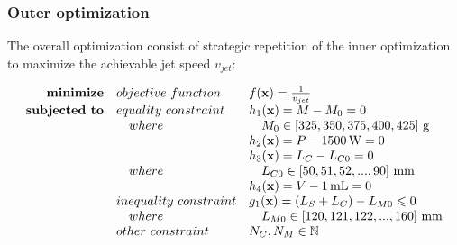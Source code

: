         \subsubsection{Outer optimization}      \label{Chapter:PMLSM design HM/design optimization/optimization formulation/out}
        
        
            The overall optimization consist of strategic repetition of the inner optimization to maximize the achievable jet speed $v_{jet}$:
        
        
            \begin{equation}
                \begin{array}{rll}
                    \textbf{minimize}       & \small{objective\,\,function}     & f(\textbf{x})=\frac{1}{v_{jet}} \\
                    \textbf{subjected to}   & \small{equality\,\,constraint}    & h_1(\textbf{x})=M - M_0= 0\\
                                            &\quad \small{where}                &\quad  M_0\in\left[325,350,375,400,425\right]\,\mathrm{g}\\
                                            &                                   & h_2(\textbf{x})=P - 1500\,\mathrm{W}=0\\
                                            &                                   & h_3(\textbf{x})=L_C - L_{C0} = 0\\
                                            &\quad \small{where}                &\quad  L_{C0}\in\left[50,51,52,...,90\right]\,\mathrm{mm}\\
                                            &                                   & h_4(\textbf{x})=V - 1\,\mathrm{mL} = 0\\
                                            & \small{inequality\,\,constraint}  & g_1(\textbf{x})=(L_S+L_C)-L_{M0} \leqslant 0\\
                                            &\quad \small{where}                &\quad L_{M0} \in \left[120,121,122,...,160\right]\,\mathrm{mm} \\
                                            & \small{other\,\,constraint}       & N_C, N_M \in 	\mathbb{N} \\ \\
                \end{array}
                \label{eq:outer optimization for PMLSMs}
            \end{equation}
            
